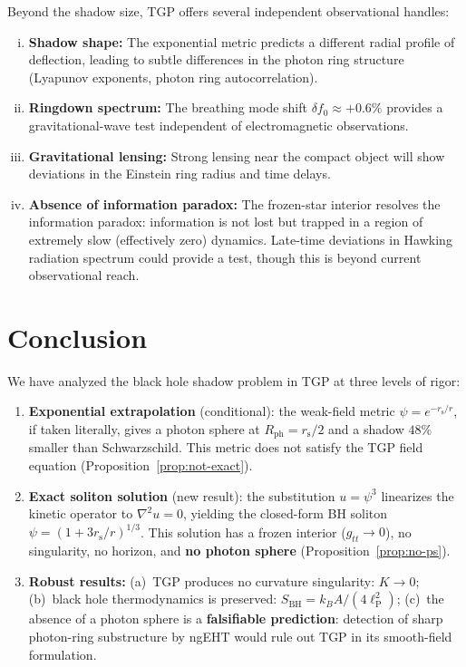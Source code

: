 \documentclass[11pt,a4paper]{article}
\theoremstyle{definition}
\theoremstyle{remark}
\newcommand{\lP}{\ell_{\mathrm{P}}}
\newcommand{\rs}{r_{\mathrm{s}}}
\begin{document}
Beyond the shadow size, TGP offers several independent observational
handles:
\begin{enumerate}[(i)]
\item \textbf{Shadow shape:}\quad
  The exponential metric predicts a different radial profile of
  deflection, leading to subtle differences in the photon ring
  structure (Lyapunov exponents, photon ring autocorrelation).

\item \textbf{Ringdown spectrum:}\quad
  The breathing mode shift $\delta f_0 \approx +0.6\%$ provides a
  gravitational-wave test independent of electromagnetic observations.

\item \textbf{Gravitational lensing:}\quad
  Strong lensing near the compact object will show deviations in the
  Einstein ring radius and time delays.

\item \textbf{Absence of information paradox:}\quad
  The frozen-star interior resolves the information paradox: information
  is not lost but trapped in a region of extremely slow (effectively
  zero) dynamics.  Late-time deviations in Hawking radiation spectrum
  could provide a test, though this is beyond current observational
  reach.
\end{enumerate}

\section{Conclusion}\label{sec:conclusion}

We have analyzed the black hole shadow problem in TGP at three levels
of rigor:

\begin{enumerate}[(1)]
  \item \textbf{Exponential extrapolation} (conditional):
    the weak-field metric $\psi = e^{-\rs/r}$, if taken literally,
    gives a photon sphere at $R_{\mathrm{ph}} = \rs/2$ and a shadow
    $48\%$ smaller than Schwarzschild.  This metric does not satisfy the
    TGP field equation (Proposition~\ref{prop:not-exact}).

  \item \textbf{Exact soliton solution} (new result):
    the substitution $u = \psi^3$ linearizes the kinetic operator to
    $\nabla^2 u = 0$, yielding the closed-form BH soliton
    $\psi = (1 + 3\rs/r)^{1/3}$.  This solution has a frozen interior
    ($g_{tt} \to 0$), no singularity, no horizon, and
    \textbf{no photon sphere} (Proposition~\ref{prop:no-ps}).

  \item \textbf{Robust results:}
    (a)~TGP produces no curvature singularity: $K \to 0$;
    (b)~black hole thermodynamics is preserved:
    $S_{\mathrm{BH}} = k_B A/(4\lP^2)$;
    (c)~the absence of a photon sphere is a \textbf{falsifiable
    prediction}: detection of sharp photon-ring substructure
    by ngEHT would rule out TGP in its smooth-field formulation.
\end{enumerate}
\end{document}
